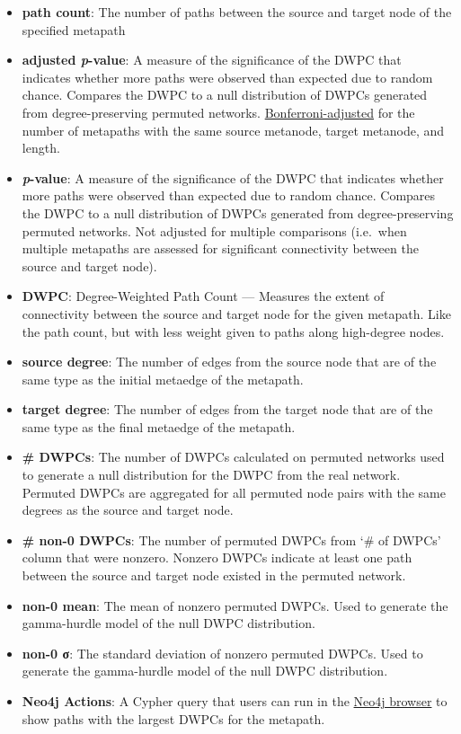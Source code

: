 \begin{itemize}
\tightlist
\item
  \textbf{path count}:
  The number of paths between the source and target node of the specified metapath
\item
  \textbf{adjusted \emph{p}-value}:
  A measure of the significance of the DWPC that indicates whether more paths were observed than expected due to random chance.
  Compares the DWPC to a null distribution of DWPCs generated from degree-preserving permuted networks.
  \protect\hyperlink{adjusting-dwpc-p-values}{Bonferroni-adjusted} for the number of metapaths with the same source metanode, target metanode, and length.
\item
  \textbf{\emph{p}-value}:
  A measure of the significance of the DWPC that indicates whether more paths were observed than expected due to random chance.
  Compares the DWPC to a null distribution of DWPCs generated from degree-preserving permuted networks.
  Not adjusted for multiple comparisons
  (i.e.~when multiple metapaths are assessed for significant connectivity between the source and target node).
\item
  \textbf{DWPC}:
  Degree-Weighted Path Count ---
  Measures the extent of connectivity between the source and target node for the given metapath.
  Like the path count, but with less weight given to paths along high-degree nodes.
\item
  \textbf{source degree}:
  The number of edges from the source node that are of the same type as the initial metaedge of the metapath.
\item
  \textbf{target degree}:
  The number of edges from the target node that are of the same type as the final metaedge of the metapath.
\item
  \textbf{\# DWPCs}:
  The number of DWPCs calculated on permuted networks used to generate a null distribution for the DWPC from the real network.
  Permuted DWPCs are aggregated for all permuted node pairs with the same degrees as the source and target node.
\item
  \textbf{\# non-0 DWPCs}:
  The number of permuted DWPCs from `\# of DWPCs' column that were nonzero.
  Nonzero DWPCs indicate at least one path between the source and target node existed in the permuted network.
\item
  \textbf{non-0 mean}:
  The mean of nonzero permuted DWPCs.
  Used to generate the gamma-hurdle model of the null DWPC distribution.
\item
  \textbf{non-0 σ}:
  The standard deviation of nonzero permuted DWPCs.
  Used to generate the gamma-hurdle model of the null DWPC distribution.
\item
  \textbf{Neo4j Actions}:
  A Cypher query that users can run in the \href{https://neo4j.het.io/browser/}{Neo4j browser} to show paths with the largest DWPCs for the metapath.
\end{itemize}

